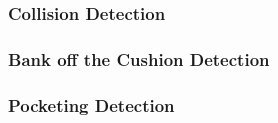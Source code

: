 \documentclass[12pt]{article}
\begin{document}
        \subsubsection{Collision Detection}
        
        \subsubsection{Bank off the Cushion Detection}
        
        \subsubsection{Pocketing Detection}
    
\end{document}
